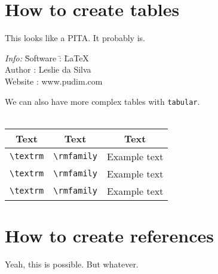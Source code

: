 \documentclass[a4paper, 12pt]{book}
\newcommand{\head}[1]{\textnormal{\textbf{#1}}}
\begin{document}
\section{How to create tables}
This looks like a PITA. It probably is.
\begin{tabbing}
    \emph{Info:} \= Software \= :  \= \LaTeX \\
    \> Author \> : \> Leslie da Silva \\
    \> Website \> : \> www.pudim.com
\end{tabbing}
We can also have more complex tables with \texttt{tabular}.\\\\
\begin{tabular}{|c|c|c|} %
    \hline
    \head{Text} & \head{Text} & \head{Text}\\
    \hline
    \verb|\textrm| & \verb|\rmfamily| & \rmfamily Example text\\
    \verb|\textrm| & \verb|\rmfamily| & \rmfamily Example text\\
    \verb|\textrm| & \verb|\rmfamily| & \rmfamily Example text\\
    \hline
\end{tabular}
\newpage
\section{How to create references}
Yeah, this is possible. But whatever.
\newpage
\end{document}
